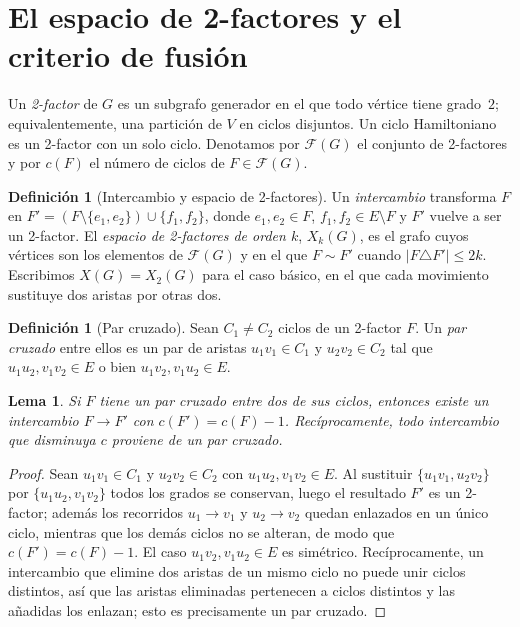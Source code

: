 \documentclass[11pt,a4paper]{article}
\newtheorem{lema}[teorema]{Lema}
\theoremstyle{definition}
\newtheorem{definicion}[teorema]{Definición}
\theoremstyle{remark}
\begin{document}
\section{El espacio de 2-factores y el criterio de fusión}\label{sec:fusion}

Un \emph{2-factor} de $G$ es un subgrafo generador en el que todo vértice tiene grado~$2$; equivalentemente, una partición de $V$ en ciclos disjuntos. Un ciclo Hamiltoniano es un 2-factor con un solo ciclo. Denotamos por $\mathcal{F}(G)$ el conjunto de 2-factores y por $c(F)$ el número de ciclos de $F\in\mathcal{F}(G)$.

\begin{definicion}[Intercambio y espacio de 2-factores]
Un \emph{intercambio} transforma $F$ en $F'=(F\setminus\{e_1,e_2\})\cup\{f_1,f_2\}$, donde $e_1,e_2\in F$, $f_1,f_2\in E\setminus F$ y $F'$ vuelve a ser un 2-factor. El \emph{espacio de 2-factores de orden $k$}, $X_k(G)$, es el grafo cuyos vértices son los elementos de $\mathcal{F}(G)$ y en el que $F\sim F'$ cuando $|F\triangle F'|\le 2k$. Escribimos $X(G)=X_2(G)$ para el caso básico, en el que cada movimiento sustituye dos aristas por otras dos.
\end{definicion}

\begin{definicion}[Par cruzado]
Sean $C_1\neq C_2$ ciclos de un 2-factor $F$. Un \emph{par cruzado} entre ellos es un par de aristas $u_1v_1\in C_1$ y $u_2v_2\in C_2$ tal que $u_1u_2,v_1v_2\in E$ o bien $u_1v_2,v_1u_2\in E$.
\end{definicion}

\begin{lema}\label{lem:fusion}
Si $F$ tiene un par cruzado entre dos de sus ciclos, entonces existe un intercambio $F\to F'$ con $c(F')=c(F)-1$. Recíprocamente, todo intercambio que disminuya $c$ proviene de un par cruzado.
\end{lema}

\begin{proof}
Sean $u_1v_1\in C_1$ y $u_2v_2\in C_2$ con $u_1u_2,v_1v_2\in E$. Al sustituir $\{u_1v_1,u_2v_2\}$ por $\{u_1u_2,v_1v_2\}$ todos los grados se conservan, luego el resultado $F'$ es un 2-factor; además los recorridos $u_1\!\to\!v_1$ y $u_2\!\to\!v_2$ quedan enlazados en un único ciclo, mientras que los demás ciclos no se alteran, de modo que $c(F')=c(F)-1$. El caso $u_1v_2,v_1u_2\in E$ es simétrico.
Recíprocamente, un intercambio que elimine dos aristas de un mismo ciclo no puede unir ciclos distintos, así que las aristas eliminadas pertenecen a ciclos distintos y las añadidas los enlazan; esto es precisamente un par cruzado.
\end{proof}
\end{document}
